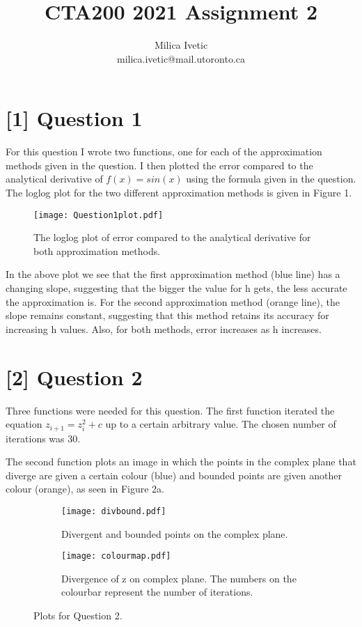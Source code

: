 \documentclass[12pt]{article}
\title{CTA200 2021 Assignment 2}
\author{Milica Ivetic \\ milica.ivetic@mail.utoronto.ca}
\date{}
\begin{document}
\maketitle


\section*{[1] Question 1}

For this question I wrote two functions, one for each of the approximation methods given in the question. I then plotted the error compared to the analytical derivative of $f(x) = sin(x)$ using the formula given in the question. The loglog plot for the two different approximation methods is given in Figure 1.  

\begin{figure}[h]
\begin{center}
\texttt{[image: Question1plot.pdf]}
\caption{The loglog plot of error compared to the analytical derivative for both approximation methods. \label{fig1}}
\end{center}
\end{figure}

In the above plot we see that the first approximation method (blue line) has a changing slope, suggesting that the bigger the value for h gets, the less accurate the approximation is. For the second approximation method (orange line), the slope remains constant, suggesting that this method retains its accuracy for increasing h values. Also, for both methods, error increases as h increases.


\section*{[2] Question 2}

Three functions were needed for this question. The first function iterated the equation $z_{i + 1} = z_i^2 + c$ up to a certain arbitrary value. The chosen number of iterations was 30. 

The second function plots an image in which the points in the complex plane that diverge are given a certain colour (blue) and bounded points are given another colour (orange), as seen in Figure 2a.


\begin{figure*}[h]
        \centering
        \begin{subfigure}[b]{0.49\textwidth}
            \centering
            \texttt{[image: divbound.pdf]}
            \caption[]%
            {{\small Divergent and bounded points on the complex plane.}}    
            \label{fig:mean and std of net14}
        \end{subfigure}
        \begin{subfigure}[b]{0.5\textwidth}   
            \centering 
            \texttt{[image: colourmap.pdf]}
            \caption[]%
            {{\small Divergence of z on complex plane. The numbers on the colourbar represent the number of iterations.}}    
        \end{subfigure}
        \caption[]%
        {\small Plots for Question 2.} 
    \end{figure*}
\end{document}
